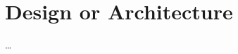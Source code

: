 
\chapter{Design or Architecture} %



\ifpdf
    \graphicspath{{3_design/figures/PNG/}{3_design/figures/PDF/}{3_design/figures/}}
\else
    \graphicspath{{3_design/figures/EPS/}{3_design/figures/}}
\fi


% 

\dots



